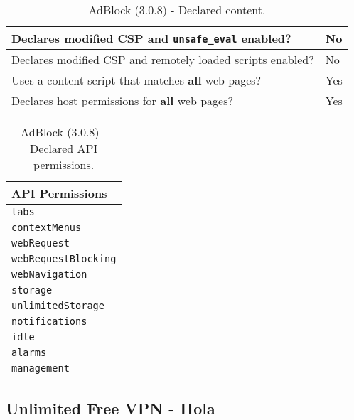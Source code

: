 \begin{table}[h]
	\centering
	\begin{tabular}{|l|l|} \hline
		Declares modified CSP and \texttt{unsafe\_eval} enabled? & No \\ \hline
		Declares modified CSP and remotely loaded scripts enabled? & No \\ \hline
		Uses a content script that matches \textbf{all} web pages? & Yes \\ \hline
		Declares host permissions for \textbf{all} web pages? & Yes \\ \hline
	\end{tabular}
	\caption{AdBlock (3.0.8) - Declared content.}
\end{table}
\begin{table}[h]
	\centering
	\begin{tabular}{|l|} \hline
		\textbf{API Permissions} \\ \hline
		\texttt{tabs} \\
		\texttt{contextMenus} \\
		\texttt{webRequest} \\
		\texttt{webRequestBlocking} \\
		\texttt{webNavigation} \\
		\texttt{storage} \\
		\texttt{unlimitedStorage} \\
		\texttt{notifications} \\
		\texttt{idle} \\
		\texttt{alarms} \\
		\texttt{management} \\
		\hline
	\end{tabular}
	\caption{AdBlock (3.0.8) - Declared API permissions.}
\end{table}
\newpage
\subsection{Unlimited Free VPN - Hola}

